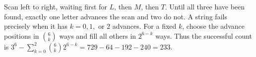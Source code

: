 Scan left to right, waiting first for $L$, then $M$, then $T$. Until all three have been found, exactly one letter advances the scan and two do not. A string fails precisely when it has $k=0,1,$ or $2$ advances. For a fixed $k$, choose the advance positions in $\binom6k$ ways and fill all others in $2^{6-k}$ ways. Thus the successful count is $3^6-\sum_{k=0}^2\binom6k2^{6-k}=729-64-192-240=\boxed{233}$.
